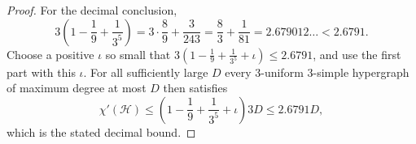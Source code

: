 \begin{proof}
For the decimal conclusion,
\[
3\left(1-\frac19+\frac1{3^5}\right)
=3\cdot\frac89+\frac{3}{243}
=\frac83+\frac1{81}
=2.679012\ldots <2.6791.
\]
Choose a positive $\iota$ so small that
$3(1-\frac19+\frac1{3^5}+\iota)\le2.6791$, and use the first part with this
$\iota$.  For all sufficiently large $D$ every $3$-uniform $3$-simple
hypergraph of maximum degree at most $D$ then satisfies
\[
\chi'(\mathcal H)\le
\left(1-\frac19+\frac1{3^5}+\iota\right)3D
\le2.6791D,
\]
which is the stated decimal bound.
\end{proof}

